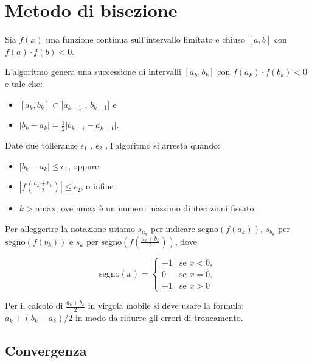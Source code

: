 \section{Metodo di bisezione}

Sia $f (x)$ una funzione continua sull'intervallo limitato e chiuso $[a, b]$ con $f (a) \cdot f (b) < 0$.

L'algoritmo genera una successione di intervalli $[a_k , b_k]$ con $f (a_k ) \cdot f (b_k ) < 0$ e tale che:

\begin{itemize}
    \item $[a_k , b_k ] \subset [a_{k-1}$ , $b_{k-1} ]$ e
    \item $|b_k - a_k | = \frac{1}{2}|b_{k-1} - a_{k-1}|$.
\end{itemize}

Date due tolleranze $\epsilon_1$ , $\epsilon_2$ , l’algoritmo si arresta quando:

\begin{itemize}
    \item $|b_k - a_k | \leq \epsilon_1$, oppure
    \item $|f (\frac {a_k +b_k}{2} )| \leq \epsilon_2$, o infine
    \item $k > \text{nmax}$, ove nmax è un numero massimo di iterazioni fissato.
\end{itemize}

Per alleggerire la notazione usiamo $s_{a_k}$ per indicare $\mathrm{segno} \left(f\left(a_k\right)\right)$,
$s_{b_k}$ per $\mathrm{segno}(f(b_k))$ e
$s_k$ per $\mathrm{segno}(f (\frac {a_k +b_k}{2}))$, dove

\begin{equation}
    \mathrm{segno}(x) =
    \begin{cases}
        -1 & \text{se } x < 0, \\
         0 & \text{{se }} x = 0, \\
        +1 & \text{{se }} x > 0
    \end{cases}
\end{equation}

Per il calcolo di $\frac{a_k+b_k}{2}$ in virgola mobile si deve usare la formula: $a_k + (b_k - a_k) / 2$ in modo da ridurre gli errori di troncamento.

\subsection{Convergenza}

